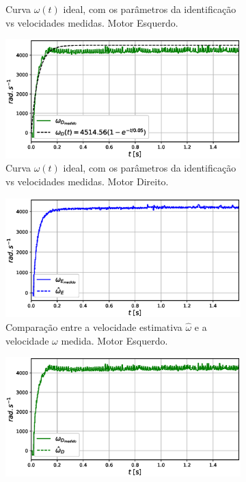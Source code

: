 \begin{figure}[H]
\begin{subfigure}{.5\textwidth}
    \caption{Curva $\omega(t)$ ideal, com os parâmetros da identificação vs velocidades medidas. Motor Esquerdo.}
    \label{fig:exp02:regressao_medido_esquerdo}
    \end{subfigure}
    \hfill
    \begin{subfigure}{.5\textwidth}
    \centering
    \includegraphics[width=\textwidth]{figuras/resultados/exp02/regressao_vs_medido_direito100.eps}
    \caption{Curva $\omega(t)$ ideal, com os parâmetros da identificação vs velocidades medidas. Motor Direito.}
    \label{fig:exp02:regressao_medido_direito}
    \end{subfigure}
    \hfill
    \begin{subfigure}{.5\textwidth}
    \centering
    \includegraphics[width=\textwidth]{figuras/resultados/exp02/filtro_vs_sem_filtro_esquerdo100.eps}
    \caption{Comparação entre a velocidade estimativa $\hat{\omega}$ e a velocidade $\omega$ medida. Motor Esquerdo.}
    \label{fig:exp02:filtragem_esquerdo}
    \end{subfigure}
    \hfill
    \begin{subfigure}{.5\textwidth}
    \centering
    \includegraphics[width=\textwidth]{figuras/resultados/exp02/filtro_vs_sem_filtro_direito100.eps}

\end{subfigure}
\end{figure}
